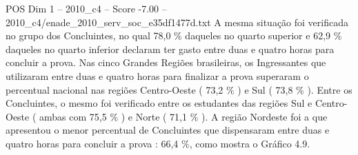 \begin{textsample}{POS Dim 1 – 2010\_c4 – Score -7.00 – 2010\_c4/enade\_2010\_serv\_soc\_e35df1477d.txt}
A mesma situação foi verificada no grupo dos Concluintes, no qual 78,0 \% daqueles no quarto superior e 62,9 \% daqueles no quarto inferior declaram ter gasto entre duas e quatro horas para concluir a prova.
Nas cinco Grandes Regiões brasileiras, os Ingressantes que utilizaram entre duas e quatro horas para finalizar a prova superaram o percentual nacional nas regiões Centro-Oeste ( 73,2 \% ) e Sul ( 73,8 \% ).
Entre os Concluintes, o mesmo foi verificado entre os estudantes das regiões Sul e Centro-Oeste ( ambas com 75,5 \% ) e Norte ( 71,1 \% ).
A região Nordeste foi a que apresentou o menor percentual de Concluintes que dispensaram entre duas e quatro horas para concluir a prova : 66,4 \%, como mostra o Gráfico 4.9.

\end{textsample}
